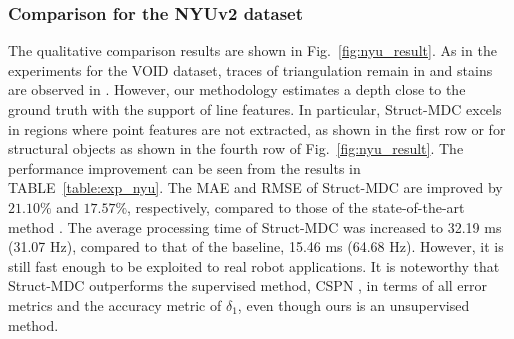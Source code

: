\subsubsection{Comparison for the NYUv2 dataset}
The qualitative comparison results are shown in Fig.~\ref{fig:nyu_result}. As in the experiments for the VOID \textcolor{color1}{dataset}, traces of triangulation remain in \cite{void} and stains are observed in \cite{baseline}. However, our methodology estimates \textcolor{color1}{a} depth close to the ground truth with the support of line features. 
In particular, Struct-MDC \textcolor{color1}{excels in} regions where point features are not extracted\textcolor{color1}{,} as shown in the first row or \textcolor{color1}{for} structural objects \textcolor{color1}{as shown in} the fourth row of Fig.~\ref{fig:nyu_result}. 
\textcolor{color1}{T}he performance improvement \textcolor{color1}{can be seen from the results in} TABLE~\ref{table:exp_nyu}. 
\textcolor{color1}{The} MAE and RMSE \textcolor{color1}{of Struct-MDC are} improved by $21.10\%$ and $17.57\%$, respectively, \textcolor{color1}{compared to those of the state-of-the-art method} \cite{baseline}. 
\textcolor{color3}{The average processing time of Struct-MDC was increased to 32.19 ms (31.07 Hz), compared to that of the baseline, 15.46 ms (64.68 Hz). However, it is still fast enough to be exploited to real robot applications.}
It is noteworthy that Struct-MDC outperforms the supervised method\textcolor{color1}{,} CSPN \cite{cspn}\textcolor{color1}{,} in \textcolor{color1}{terms of} all error metrics and \textcolor{color1}{the} accuracy metric of $\delta_1$, even though ours is an unsupervised method. 



